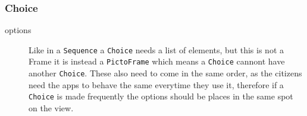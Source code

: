 \subsubsection{Choice}

\begin{description}
	\item[options] Like in a \texttt{Sequence} a \texttt{Choice} needs a list of elements, but this is not a Frame it is instead a \texttt{PictoFrame} which means a \texttt{Choice} cannont have another \texttt{Choice}.
	These also need to come in the same order, as the citizens need the apps to behave the same everytime they use it, therefore if a \texttt{Choice} is made frequently the options should be places in the same spot on the view.
\end{description}

